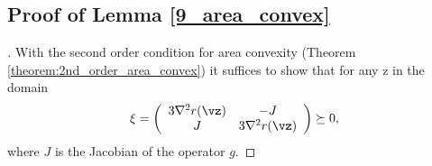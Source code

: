 \subsection{Proof of Lemma \ref{9_area_convex}}
\begin{proof} [\unskip\nopunct]
    With the second order condition for area convexity (Theorem \ref{theorem:2nd_order_area_convex}) it suffices to show that for any z in the domain
    \begin{equation*}
        \xi = \left(
        \begin{array}{cc}
        3 \nabla^2 r(\vz) & -J \\
        J & 3 \nabla^2 r(\vz)
        \end{array} \right) \succeq 0,
    \end{equation*}
    where $J$ is the Jacobian of the operator $g$. 
    

\end{proof}
